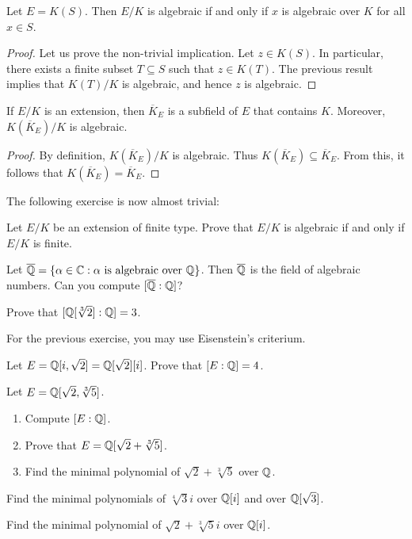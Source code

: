 \begin{corollary}
	Let $E=K(S)$. Then $E/K$ is algebraic if and only if
	$x$ is algebraic over $K$ for all $x\in S$. 
\end{corollary}

\begin{proof}
	Let us prove the non-trivial implication. Let $z\in K(S)$. In particular, 
	there exists a finite subset $T\subseteq S$ such that 
	$z\in K(T)$. The previous result implies that $K(T)/K$ is algebraic, and
	hence $z$ is algebraic. 
\end{proof}

\begin{corollary}
	If $E/K$ is  an extension, then $\overline{K}_E$ 
	is a subfield of $E$ that contains $K$. Moreover, 
	$K(\overline{K}_E)/K$ is algebraic. 
\end{corollary}	

\begin{proof}
    By definition, $K(\overline{K}_E)/K$ is algebraic. 
    Thus $K(\overline{K}_E)\subseteq\overline{K}_E$. From this, it follows that
    $K(\overline{K}_E)=\overline{K}_E$. 
\end{proof}

The following exercise is now almost trivial:

\begin{exercise}
    Let $E/K$ be an extension of finite type. 
    Prove that $E/K$ is algebraic if and only if $E/K$ 
    is finite. 
\end{exercise}

Let $\overline{\mathbb{Q}}=\{\alpha\in\mathbb{C}:\alpha\text{ is algebraic over }\mathbb{Q}\}$. 
Then $\overline{\mathbb{Q}}$ is the field of algebraic numbers. 
Can you compute $[\overline{\mathbb{Q}}:\mathbb{Q}]$?

\begin{exercise}
    Prove that $[\mathbb{Q}[\sqrt[3]{2}]:\mathbb{Q}]=3$. 
\end{exercise}

For the previous exercise, you may use Eisenstein's criterium. 

\begin{exercise}
    Let $E=\mathbb{Q}[i,\sqrt{2}]=\mathbb{Q}[\sqrt{2}][i]$. Prove that $[E:\mathbb{Q}]=4$.  
\end{exercise}

\begin{exercise}
    Let $E=\mathbb{Q}[\sqrt{2},\sqrt[3]{5}]$. 
    \begin{enumerate}
        \item Compute $[E:\mathbb{Q}]$.
        \item Prove that $E=\mathbb{Q}[\sqrt{2}+\sqrt[3]{5}]$.
        \item Find the minimal polynomial of $\sqrt{2}+\sqrt[3]{5}$ over $\mathbb{Q}$. 
    \end{enumerate}
\end{exercise}

\begin{exercise}
    Find the minimal polynomials of $\sqrt[4]{3}i$ over $\mathbb{Q}[i]$ and over $\mathbb{Q}[\sqrt{3}]$. 
\end{exercise}

\begin{exercise}
    Find the minimal polynomial of $\sqrt{2}+\sqrt[3]{5}i$ over $\mathbb{Q}[i]$.
\end{exercise}